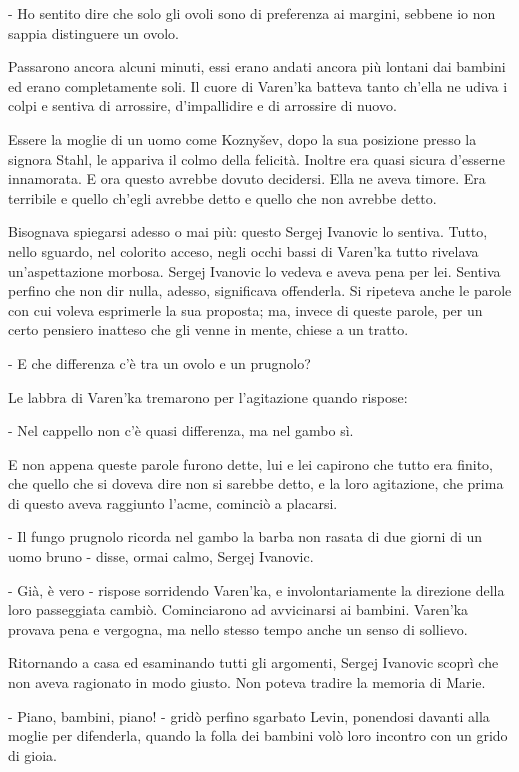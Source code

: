 - Ho sentito dire che solo gli ovoli sono di preferenza ai margini, sebbene io non sappia distinguere un ovolo. 

Passarono ancora alcuni minuti, essi erano andati ancora più lontani dai bambini ed erano completamente soli. Il cuore di Varen'ka batteva tanto ch'ella ne udiva i colpi e sentiva di arrossire, d'impallidire e di arrossire di nuovo. 

Essere la moglie di un uomo come Koznyšev, dopo la sua posizione presso la signora Stahl, le appariva il colmo della felicità. Inoltre era quasi sicura d'esserne innamorata. E ora questo avrebbe dovuto decidersi. Ella ne aveva timore. Era terribile e quello ch'egli avrebbe detto e quello che non avrebbe detto. 

Bisognava spiegarsi adesso o mai più: questo Sergej Ivanovic lo sentiva. Tutto, nello sguardo, nel colorito acceso, negli occhi bassi di Varen'ka tutto rivelava un'aspettazione morbosa. Sergej Ivanovic lo vedeva e aveva pena per lei. Sentiva perfino che non dir nulla, adesso, significava offenderla. Si ripeteva anche le parole con cui voleva esprimerle la sua proposta; ma, invece di queste parole, per un certo pensiero inatteso che gli venne in mente, chiese a un tratto. 

- E che differenza c'è tra un ovolo e un prugnolo? 

Le labbra di Varen'ka tremarono per l'agitazione quando rispose: 

- Nel cappello non c'è quasi differenza, ma nel gambo sì. 

E non appena queste parole furono dette, lui e lei capirono che tutto era finito, che quello che si doveva dire non si sarebbe detto, e la loro agitazione, che prima di questo aveva raggiunto l'acme, cominciò a placarsi. 

- Il fungo prugnolo ricorda nel gambo la barba non rasata di due giorni di un uomo bruno - disse, ormai calmo, Sergej Ivanovic. 

- Già, è vero - rispose sorridendo Varen'ka, e involontariamente la direzione della loro passeggiata cambiò. Cominciarono ad avvicinarsi ai bambini. Varen'ka provava pena e vergogna, ma nello stesso tempo anche un senso di sollievo. 

Ritornando a casa ed esaminando tutti gli argomenti, Sergej Ivanovic scoprì che non aveva ragionato in modo giusto. Non poteva tradire la memoria di Marie. 

- Piano, bambini, piano! - gridò perfino sgarbato Levin, ponendosi davanti alla moglie per difenderla, quando la folla dei bambini volò loro incontro con un grido di gioia. 

